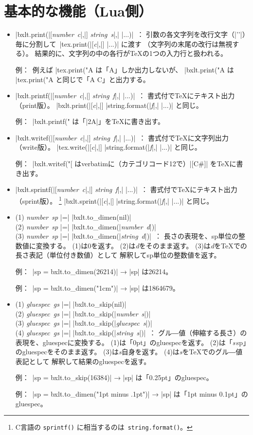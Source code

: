 \documentclass[a4paper]{ltjsarticle}
\newcommand{\Means}{~：\quad}
\newcommand{\Expl}{\par\noindent 例：\ }
\newcommand{\Typ}[1]{\textsl{#1}}
\newcommand{\Var}[1]{\textit{#1}}
\newcommand{\NumberT}{\Typ{number}}
\newcommand{\NumVar}{\NumberT\ \Var}
\newcommand{\StringT}{\Typ{string}}
\newcommand{\StrVar}{\StringT\ \Var}
\newcommand{\GluespecT}{\Typ{gluespec}}
\newcommand{\GlueVar}{\GluespecT\ \Var}
\begin{document}
\section{基本的な機能（Lua側）}
\label{sec:basic-lua}

\begin{itemize}
\item |bxlt.print(|[\NumVar{c}|,|] \StrVar{s}|,| |...)|\Means
  引数の各文字列を改行文字（|'\n'|）毎に分割して\ 
  |tex.print(|[\Var{c}|,|] |...)| に渡す
  （文字列の末尾の改行は無視する）。 
  結果的に、文字列の中の各行が{\TeX}の1つの入力行と扱われる。
  \Expl 例えば |tex.print("A%
  は「A」しか出力しないが、
  |bxlt.print("A%
  は |tex.print("A%
  と同じで「A C」と出力する。
\item |bxlt.printf(|[\NumVar{c}|,|] \StrVar{f}|,| |...)|\Means
  書式付で{\TeX}にテキスト出力（print版）。
  |bxlt.print(|[\Var{c}|,|] |string.format(|\Var{f}|,| |...)|
  と同じ。
  \Expl |bxlt.printf("%
  は「|2A|」を{\TeX}に書き出す。
\item |bxlt.writef(|[\NumVar{c}|,|] \StrVar{f}|,| |...)|\Means
  書式付で{\TeX}に文字列出力（write版）。
  |tex.write(|[\Var{c}|,|] |string.format(|\Var{f}|,| |...)|
  と同じ。
  \Expl |bxlt.writef("[%
  はverbatimに（カテゴリコード12で）|[C#]| を{\TeX}に書き出す。
\item |bxlt.sprintf(|[\NumVar{c}|,|] \StrVar{f}|,| |...)|\Means
  書式付で{\TeX}にテキスト出力（sprint版）。
  \footnote{C言語の \texttt{sprintf()} に相当するのは\ 
    \texttt{string.format()}。}
  |bxlt.sprint(|[\Var{c}|,|] |string.format(|\Var{f}|,| |...)|
  と同じ。
\item (1) \NumVar{sp} |=| |bxlt.to_dimen(nil)|\\
  (2) \NumVar{sp} |=| |bxlt.to_dimen(|\NumVar{d}|)|\\
  (3) \NumVar{sp} |=| |bxlt.to_dimen(|\StrVar{d}|)|\Means
  長さの表現を、sp単位の整数値に変換する。
  (1)は0を返す。
  (2)は\Var{d}をそのまま返す。
  (3)は\Var{d}を{\TeX}での長さ表記（単位付き数値）として
  解釈してsp単位の整数値を返す。
  \Expl |sp = bxlt.to_dimen(26214)| → |sp| は26214。
  \Expl |sp = bxlt.to_dimen("1cm")| → |sp| は1864679。
\item (1) \GlueVar{gs} |=| |bxlt.to_skip(nil)|\\
  (2) \GlueVar{gs} |=| |bxlt.to_skip(|\NumVar{s}|)|\\
  (3) \GlueVar{gs} |=| |bxlt.to_skip(|\GlueVar{s}|)|\\
  (4) \GlueVar{gs} |=| |bxlt.to_skip(|\StrVar{s}|)|\Means
  グル―値（伸縮する長さ）の表現を、gluespecに変換する。
  (1)は「0pt」のgluespecを返す。
  (2)は「\Var{s}\,sp」のgluespecをそのまま返す。
  (3)は\Var{s}自身を返す。
  (4)は\Var{s}を{\TeX}でのグル―値表記として
  解釈して結果のgluespecを返す。
  \Expl |sp = bxlt.to_skip(16384)| → |sp| は「0.25pt」のgluespec。
  \Expl |sp = bxlt.to_dimen("1pt minus .1pt")| → |sp| は「1pt minus 0.1pt」のgluespec。
\end{itemize}
\end{document}
